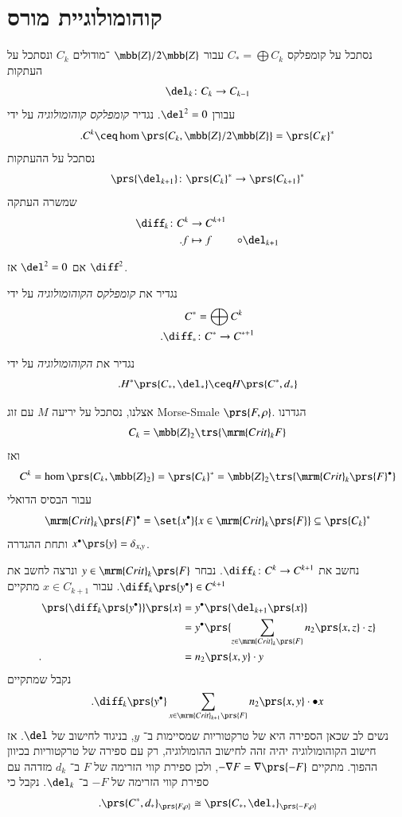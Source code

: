 \documentclass[a4paper,10pt,twoside,openany]{book}
\begin{document}
\section{קוהומולוגיית מורס}

נסתכל על קומפלקס
$C_* = \bigoplus C_k$
עבור
$\mbb{Z}/2\mbb{Z}$%
־מודולים
$C_k$
ונסתכל על העתקות
\[\del_k \colon C_k \to C_{k-1}\]
עבורן
$\del^2 = 0$.
נגדיר
\emph{קומפלקס קוהומולוגיה}
על ידי
\[\text{.} C^k \ceq \hom\prs{C_k, \mbb{Z}/2\mbb{Z}} = \prs{C_K}^*\]
נסתכל על ההעתקות
\begin{align*}
\prs{\del_{k+1}} \colon \prs{C_k}^* \to \prs{C_{k+1}}^*
\end{align*}
שמשרה העתקה
\begin{align*}
\diff_k \colon C^k &\to C^{k+1} \\
\text{.} f &\mapsto f &\circ \del_{k+1}
\end{align*}

\begin{exercise}
אם
$\del^2 = 0$
אז
$\diff^2$.
\end{exercise}

\begin{definition}
נגדיר את
\emph{קומפלקס הקוהומולוגיה}
על ידי
\begin{align*}
C^* &= \bigoplus C^k \\
\text{.} \diff_* &\colon C^* \to C^{*+1}
\end{align*}
\end{definition}

\begin{definition}[קוהומולוגיה]
נגדיר את
\emph{הקוהומולוגיה}
על ידי
\[\text{.} H^*\prs{C_*, \del_*} \ceq H\prs{C^*, d_*}\]
\end{definition}

אצלנו, נסתכל על יריעה
$M$
עם זוג
\textenglish{Morse-Smale}
$\prs{F,\rho}$.
הגדרנו
\[C_k = \mbb{Z}_2 \trs{\mrm{Crit}_k F}\]
ואז
\[C^k = \hom\prs{C_k, \mbb{Z}_2} = \prs{C_k}^* = \mbb{Z}_2 \trs{\mrm{Crit}_k\prs{F}^{\bullet}}\]
עבור הבסיס הדואלי
\[\mrm{Crit}_k\prs{F}^\bullet = \set{x^\bullet}{x \in \mrm{Crit}_k\prs{F}} \subseteq \prs{C_k}^*\]
ותחת ההגדרה
$x^\bullet\prs{y} = \delta_{x,y}$.

נחשב את
$\diff_k \colon C^k \to C^{k+1}$.
נבחר
$y \in \mrm{Crit}_k\prs{F}$
ונרצה לחשב את
$\diff_k\prs{y^\bullet} \in C^{k+1}$.
עבור
$x \in C_{k+1}$
מתקיים
\begin{align*}
\prs{\diff_k\prs{y^\bullet}}\prs{x} &= y^\bullet\prs{\del_{k+1}\prs{x}}
\\&= y^\bullet\prs{\sum_{z \in \mrm{Crit}_k\prs{F}} n_2\prs{x,z} \cdot z}
\\ \text{.} \hphantom{\prs{\diff_k\prs{y^\bullet}}\prs{x}} &= n_2\prs{x,y} \cdot y
\end{align*}
נקבל שמתקיים
\[\text{.} \diff_k\prs{y^\bullet} \sum_{x \in \mrm{Crit}_{k+1}\prs{F}} n_2\prs{x,y} \cdot \bullet{x}\]
נשים לב שכאן הספירה היא של טרקטוריות שמסיימות ב־%
$y$,
בניגוד לחישוב של
$\del$.
אז חישוב הקוהומולוגיה יהיה זהה לחישוב ההומולוגיה, רק עם ספירה של טרקטוריות בכיוון ההפוך. מתקיים
$-\nabla F = \nabla\prs{-F}$,
ולכן ספירת קווי הזרימה של
$F$
ב־%
$d_k$
מזדהה עם ספירת קווי הזרימה של
$-F$
ב־%
$\del_k$.
נקבל כי
\[\text{.} \prs{C^*, d_*}_{\prs{F, \rho}} \cong \prs{C_*, \del_*}_{\prs{-F, \rho}}\]
\end{document}
